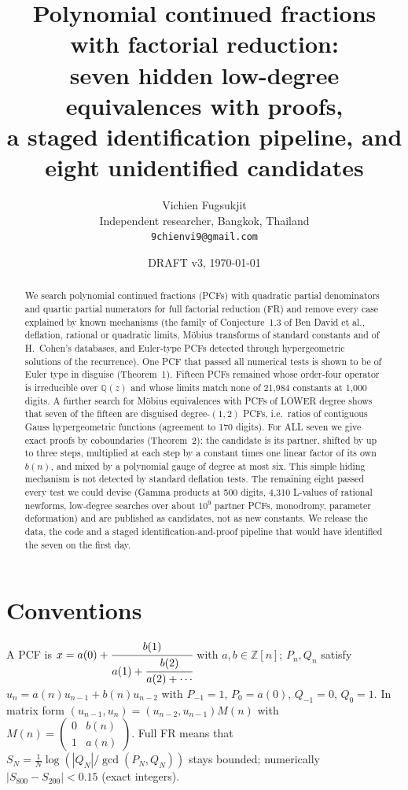 \documentclass[11pt]{article}
\title{Polynomial continued fractions with factorial reduction:\\ seven hidden low-degree equivalences with proofs,\\ a staged identification pipeline, and eight unidentified candidates}
\author{Vichien Fugsukjit\\ Independent researcher, Bangkok, Thailand\\ \texttt{9chienvi9@gmail.com}}
\date{DRAFT v3, \today}
\begin{document}
\maketitle
\begin{abstract}
We search polynomial continued fractions (PCFs) with quadratic partial denominators and quartic partial numerators for full
factorial reduction (FR) and remove every case explained by known mechanisms (the family of Conjecture~1.3 of Ben David et al.,
deflation, rational or quadratic limits, M\"obius transforms of standard constants and of H.~Cohen's databases, and Euler-type
PCFs detected through hypergeometric solutions of the recurrence). One PCF that passed all numerical tests is shown to be of Euler
type in disguise (Theorem~1). Fifteen PCFs remained whose order-four operator is irreducible over $\mathbb Q(z)$ and whose limits
match none of 21{,}984 constants at 1{,}000 digits. A further search for M\"obius equivalences with PCFs of LOWER degree shows that
seven of the fifteen are disguised degree-$(1,2)$ PCFs, i.e.\ ratios of contiguous Gauss hypergeometric functions (agreement to
170 digits). For ALL seven we give exact proofs by coboundaries (Theorem~2): the candidate is its partner, shifted by up to
three steps, multiplied at each step by a constant times one linear factor of its own $b(n)$, and mixed by a polynomial gauge of
degree at most six. This simple hiding mechanism is not detected by standard deflation tests. The remaining eight passed every test we could devise (Gamma products at 500 digits,
4{,}310 L-values of rational newforms, low-degree searches over about $10^9$ partner PCFs, monodromy, parameter deformation)
and are published as candidates, not as new constants. We release the data, the code and a staged identification-and-proof
pipeline that would have identified the seven on the first day.
\end{abstract}

\section{Conventions}
A PCF is $x=a(0)+\cfrac{b(1)}{a(1)+\cfrac{b(2)}{a(2)+\cdots}}$ with $a,b\in\mathbb Z[n]$; $P_n,Q_n$ satisfy $u_n=a(n)u_{n-1}+b(n)u_{n-2}$
with $P_{-1}=1$, $P_0=a(0)$, $Q_{-1}=0$, $Q_0=1$. In matrix form $(u_{n-1},u_n)=(u_{n-2},u_{n-1})M(n)$ with $M(n)=\left(\begin{smallmatrix}0&b(n)\\1&a(n)\end{smallmatrix}\right)$.
Full FR means that $S_N=\frac1N\log(|Q_N|/\gcd(P_N,Q_N))$ stays bounded; numerically $|S_{800}-S_{200}|<0.15$ (exact integers).
\end{document}
